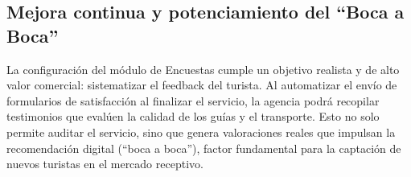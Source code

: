 \subsection{Mejora continua y potenciamiento del ``Boca a Boca''}
\begin{indentedsubsection}
La configuración del módulo de Encuestas cumple un objetivo realista y de alto valor comercial: sistematizar el feedback del turista. Al automatizar el envío de formularios de satisfacción al finalizar el servicio, la agencia podrá recopilar testimonios que evalúen la calidad de los guías y el transporte. Esto no solo permite auditar el servicio, sino que genera valoraciones reales que impulsan la recomendación digital (``boca a boca''), factor fundamental para la captación de nuevos turistas en el mercado receptivo.
\end{indentedsubsection}
